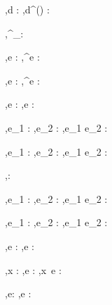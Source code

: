   {\Gamma,\Sigma \infers d : \Task \tau}
  {\Gamma,\Sigma \infers d^{(\nu)} : }
  {}

  {}
  {\Gamma,\Sigma \infers \Enter^\nu_\beta : }
  {}

  {\Gamma,\Sigma \infers e : \beta}
  {\Gamma,\Sigma \infers \Update^\nu e : }
  {}

  {\Gamma,\Sigma \infers e : \beta}
  {\Gamma,\Sigma \infers \View^\nu e : }
  {}


  {\Gamma,\Sigma \infers e : \tau}
  {\Gamma,\Sigma \infers \Lift e : }
  {}

  {\Gamma,\Sigma \infers e_1 :  \Quad
   \Gamma,\Sigma \infers e_2 : }
  {\Gamma,\Sigma \infers e_1 \Pair e_2 : }
  {}

  {\Gamma,\Sigma \infers e_1 :  \Quad
   \Gamma,\Sigma \infers e_2 : }
  {\Gamma,\Sigma \infers e_1 \Choose e_2 : }
  {}

  {}
  {\Gamma,\Sigma \infers \Fail : \shaded{\Task \rho}}
  {}


  {\Gamma,\Sigma \infers e_1 :  \Quad
   \Gamma,\Sigma \infers e_2 : }
  {\Gamma,\Sigma \infers e_1 \Trans e_2 : }
  {}

  {\Gamma,\Sigma \infers e_1 :  \Quad
   \Gamma,\Sigma \infers e_2 : }
  {\Gamma,\Sigma \infers e_1 \Step e_2 : }
  {}

  {\Gamma,\Sigma \infers e : \Bool}
  {\Gamma,\Sigma \infers \Assert e : }
  {}

  {\Gamma,\Sigma \infers x :  \Quad
   \Gamma,\Sigma \infers e : }
  {\Gamma,\Sigma \infers x\ e : \shaded{\Task\ \rho}}
  {}

  {\Gamma,\Sigma \infers e: \beta}
  {\Gamma,\Sigma \infers \Share e : }
  {}

